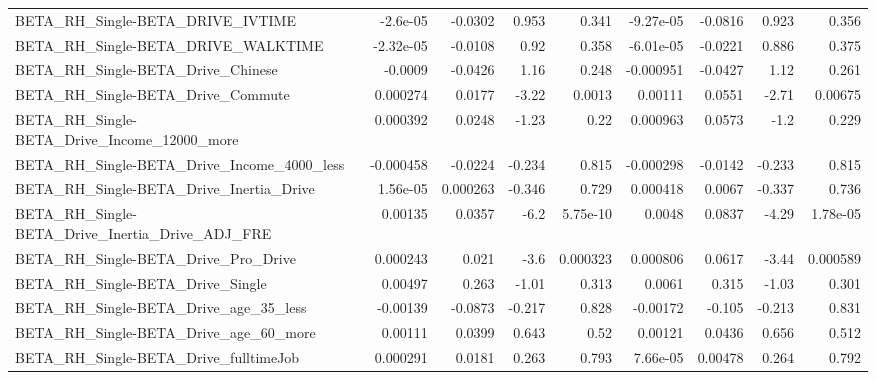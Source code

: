 \begin{tabular}{lrrrrrrrr}
BETA\_RH\_Single-BETA\_DRIVE\_IVTIME                   &    -2.6e-05 &      -0.0302 &    0.953 &    0.341 &  -9.27e-05 &     -0.0816 &        0.923 &         0.356 \\
BETA\_RH\_Single-BETA\_DRIVE\_WALKTIME                 &   -2.32e-05 &      -0.0108 &     0.92 &    0.358 &  -6.01e-05 &     -0.0221 &        0.886 &         0.375 \\
BETA\_RH\_Single-BETA\_Drive\_Chinese                  &     -0.0009 &      -0.0426 &     1.16 &    0.248 &  -0.000951 &     -0.0427 &         1.12 &         0.261 \\
BETA\_RH\_Single-BETA\_Drive\_Commute                  &    0.000274 &       0.0177 &    -3.22 &   0.0013 &    0.00111 &      0.0551 &        -2.71 &       0.00675 \\
BETA\_RH\_Single-BETA\_Drive\_Income\_12000\_more        &    0.000392 &       0.0248 &    -1.23 &     0.22 &   0.000963 &      0.0573 &         -1.2 &         0.229 \\
BETA\_RH\_Single-BETA\_Drive\_Income\_4000\_less         &   -0.000458 &      -0.0224 &   -0.234 &    0.815 &  -0.000298 &     -0.0142 &       -0.233 &         0.815 \\
BETA\_RH\_Single-BETA\_Drive\_Inertia\_Drive            &    1.56e-05 &     0.000263 &   -0.346 &    0.729 &   0.000418 &      0.0067 &       -0.337 &         0.736 \\
BETA\_RH\_Single-BETA\_Drive\_Inertia\_Drive\_ADJ\_FRE    &     0.00135 &       0.0357 &     -6.2 & 5.75e-10 &     0.0048 &      0.0837 &        -4.29 &      1.78e-05 \\
BETA\_RH\_Single-BETA\_Drive\_Pro\_Drive                &    0.000243 &        0.021 &     -3.6 & 0.000323 &   0.000806 &      0.0617 &        -3.44 &      0.000589 \\
BETA\_RH\_Single-BETA\_Drive\_Single                   &     0.00497 &        0.263 &    -1.01 &    0.313 &     0.0061 &       0.315 &        -1.03 &         0.301 \\
BETA\_RH\_Single-BETA\_Drive\_age\_35\_less              &    -0.00139 &      -0.0873 &   -0.217 &    0.828 &   -0.00172 &      -0.105 &       -0.213 &         0.831 \\
BETA\_RH\_Single-BETA\_Drive\_age\_60\_more              &     0.00111 &       0.0399 &    0.643 &     0.52 &    0.00121 &      0.0436 &        0.656 &         0.512 \\
BETA\_RH\_Single-BETA\_Drive\_fulltimeJob              &    0.000291 &       0.0181 &    0.263 &    0.793 &   7.66e-05 &     0.00478 &        0.264 &         0.792 \\

\end{tabular}
